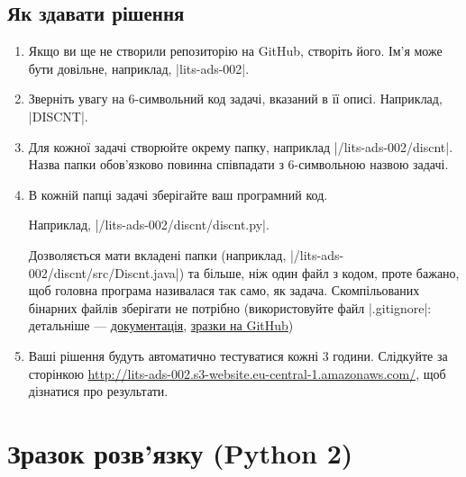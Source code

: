 \documentclass[12pt,a4paper]{article}
\begin{document}
\subsection*{Як здавати рішення}

\begin{enumerate}
    \item Якщо ви ще не створили репозиторію на GitHub, створіть його. Ім’я може бути довільне, наприклад, |lits-ads-002|.
    \item Зверніть увагу на 6-символьний код задачі, вказаний в її описі. Наприклад, |DISCNT|.
    \item Для кожної задачі створюйте окрему папку, наприклад |/lits-ads-002/discnt|. Назва папки обов’язково повинна співпадати з 6-символьною назвою задачі.
    \item В кожній папці задачі зберігайте ваш програмний код.

    Наприклад, |/lits-ads-002/discnt/discnt.py|.

    Дозволяється мати вкладені папки (наприклад, |/lits-ads-002/discnt/src/Discnt.java|) та більше, ніж один файл з кодом, проте бажано, щоб головна програма називалася так само, як задача. Скомпільованих бінарних файлів зберігати не потрібно (використовуйте файл |.gitignore|: детальніше --- \href{http://git-scm.com/docs/gitignore}{документація}, \href{https://github.com/github/gitignore}{зразки на GitHub})

    \item Ваші рішення будуть автоматично тестуватися кожні 3 години. Слідкуйте за сторінкою \href{http://lits-ads-002.s3-website.eu-central-1.amazonaws.com/}{http://lits-ads-002.s3-website.eu-central-1.amazonaws.com/}, щоб дізнатися про результати.
\end{enumerate}


\pagebreak





\pagebreak


\section*{Зразок розв’язку (Python 2)}



\end{document}

